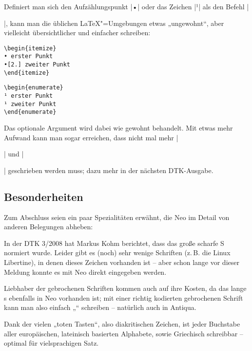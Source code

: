 \documentclass[ngerman]{dtk}
\begin{document}
{Definiert man sich den Aufzählungspunkt |•| oder das Zeichen |¹| als den Befehl |\item|, kann man die üblichen \LaTeX"=Umgebungen etwas „ungewohnt“, aber vielleicht übersichtlicher und einfacher schreiben:

\begin{minipage}{.4\textwidth}
\begin{verbatim}
\begin{itemize}
• erster Punkt
•[2.] zweiter Punkt
\end{itemize} 
\end{verbatim}
\end{minipage}
\hfill
\begin{minipage}{.4\textwidth}
\begin{verbatim}
\begin{enumerate}
¹ erster Punkt
¹ zweiter Punkt
\end{enumerate} 
\end{verbatim}
\end{minipage}

Das optionale Argument wird dabei wie gewohnt behandelt. Mit etwas mehr Aufwand kann man sogar erreichen, dass nicht mal mehr |\begin{itemize}| und |\end{itemize}| geschrieben werden muss; dazu mehr in der nächsten DTK-Ausgabe.

\subsection{Besonderheiten}
Zum Abschluss seien ein paar Spezialitäten erwähnt, die Neo im Detail von anderen Belegungen abheben:

In der DTK 3/2008 hat Markus Kohm berichtet, dass das große scharfe S  normiert wurde. Leider gibt es (noch) sehr wenige Schriften (z.\,B. die Linux Libertine), in denen dieses Zeichen vorhanden ist – aber schon lange vor dieser Meldung konnte es mit Neo direkt eingegeben werden.

Liebhaber der gebrochenen Schriften kommen auch auf ihre Kosten, da das lange s  ebenfalls in Neo vorhanden ist; mit einer richtig kodierten gebrochenen Schrift kann man also einfach „“ schreiben – natürlich auch in Antiqua.

Dank der vielen „toten Tasten“, also diakritischen Zeichen, ist jeder Buchstabe aller europäischen, lateinisch basierten Alphabete, sowie Griechisch schreibbar – optimal für vielsprachigen Satz.

}
\end{document}
